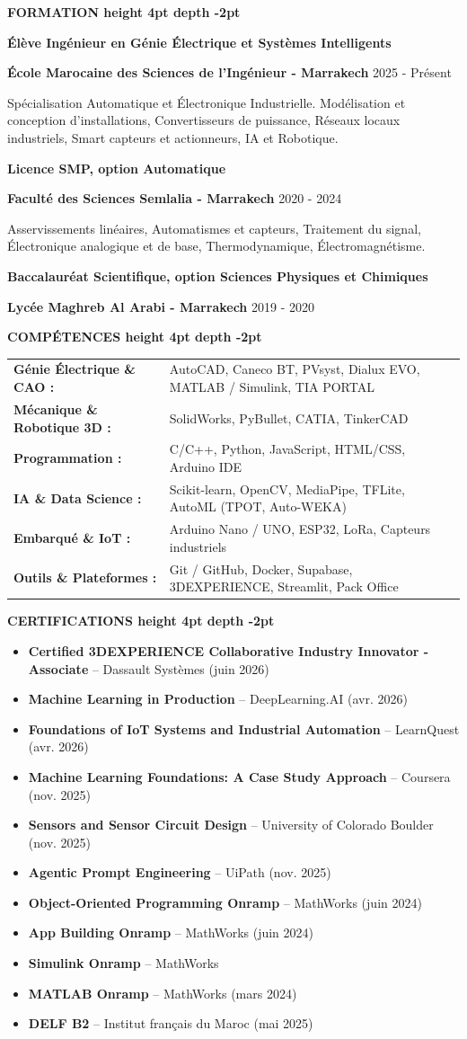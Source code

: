 \documentclass[10pt,a4paper]{altacv}
\renewcommand{\cvsection}[2][]{%
  \medskip%
  {\color{heading}\LARGE\bfseries #2 \hspace{0.2em}\leaders\vrule height 4pt depth -2pt\hfill\mbox{}}\par\smallskip
}
\renewcommand{\divider}{\textcolor{body!30}{\hdashrule{\linewidth}{0.6pt}{0.5ex}}\smallskip}
\renewcommand{\cvevent}[4]{%
  {\large\bfseries\color{accent}#1\par}
  \smallskip\normalsize
  \ifstrequal{#2}{}{}{%
    \textbf{\color{emphasis}#2\ifstrequal{#4}{}{}{ - #4}}%
  }%
  \hfill
  \ifstrequal{#3}{}{}{{\small#3}}%
  \par\smallskip
}
\begin{document}
\cvsection{FORMATION}
\cvevent{Élève Ingénieur en Génie Électrique et Systèmes Intelligents}{École Marocaine des Sciences de l'Ingénieur}{2025 - Présent}{Marrakech}
\small Spécialisation Automatique et Électronique Industrielle. Modélisation et conception d'installations, Convertisseurs de puissance, Réseaux locaux industriels, Smart capteurs et actionneurs, IA et Robotique.

\divider
\cvevent{Licence SMP, option Automatique}{Faculté des Sciences Semlalia}{2020 - 2024}{Marrakech}
\small Asservissements linéaires, Automatismes et capteurs, Traitement du signal, Électronique analogique et de base, Thermodynamique, Électromagnétisme.

\divider
\cvevent{Baccalauréat Scientifique, option Sciences Physiques et Chimiques}{Lycée Maghreb Al Arabi}{2019 - 2020}{Marrakech}


\cvsection{COMPÉTENCES}
\begin{tabular}{@{}ll@{}}
\textbf{Génie Électrique \& CAO :} & AutoCAD, Caneco BT, PVsyst, Dialux EVO, MATLAB / Simulink, TIA PORTAL \\[1pt]
\textbf{Mécanique \& Robotique 3D :} & SolidWorks, PyBullet, CATIA, TinkerCAD \\[1pt]
\textbf{Programmation :} & C/C++, Python, JavaScript, HTML/CSS, Arduino IDE \\[1pt]
\textbf{IA \& Data Science :} & Scikit-learn, OpenCV, MediaPipe, TFLite, AutoML (TPOT, Auto-WEKA) \\[1pt]
\textbf{Embarqué \& IoT :} & Arduino Nano / UNO, ESP32, LoRa, Capteurs industriels \\[1pt]
\textbf{Outils \& Plateformes :} & Git / GitHub, Docker, Supabase, 3DEXPERIENCE, Streamlit, Pack Office \\
\end{tabular}


\cvsection{CERTIFICATIONS}
\begin{itemize}
  \item \textbf{Certified 3DEXPERIENCE Collaborative Industry Innovator - Associate} -- Dassault Systèmes (juin 2026)
  \item \textbf{Machine Learning in Production} -- DeepLearning.AI (avr. 2026)
  \item \textbf{Foundations of IoT Systems and Industrial Automation} -- LearnQuest (avr. 2026)
  \item \textbf{Machine Learning Foundations: A Case Study Approach} -- Coursera (nov. 2025)
  \item \textbf{Sensors and Sensor Circuit Design} -- University of Colorado Boulder (nov. 2025)
  \item \textbf{Agentic Prompt Engineering} -- UiPath (nov. 2025)
  \item \textbf{Object-Oriented Programming Onramp} -- MathWorks (juin 2024)
  \item \textbf{App Building Onramp} -- MathWorks (juin 2024)
  \item \textbf{Simulink Onramp} -- MathWorks
  \item \textbf{MATLAB Onramp} -- MathWorks (mars 2024)
  \item \textbf{DELF B2} -- Institut français du Maroc (mai 2025)
\end{itemize}
\end{document}
